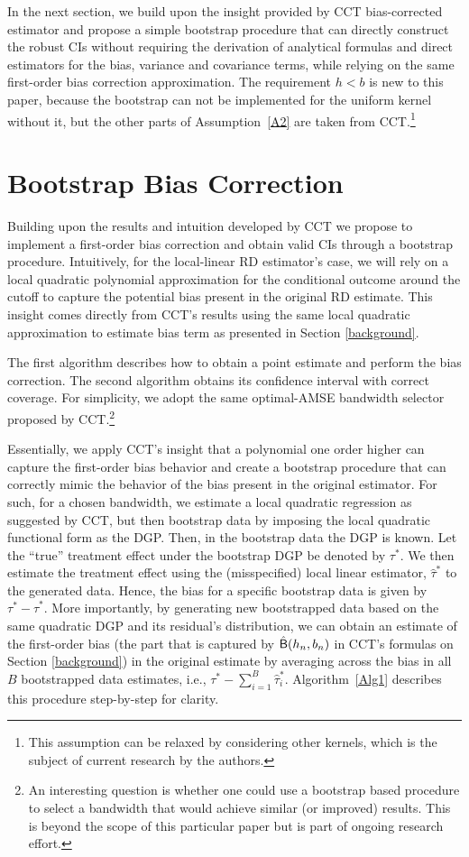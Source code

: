 \documentclass[12pt,fleqn]{article}
\begin{document}
In the next section, we build upon the insight provided by CCT bias-corrected
estimator and propose a simple bootstrap procedure that can directly construct
the robust CIs without requiring the derivation of analytical formulas and
direct estimators for the bias, variance and covariance terms, while relying on
the same first-order bias correction approximation. The requirement $h < b$ is
new to this paper, because the bootstrap can not be implemented for the uniform
kernel without it, but the other parts of Assumption~\ref{A2} are taken from
CCT.\footnote{%
  This assumption can be relaxed by considering other kernels, which is the
  subject of current research by the authors.} %

\section{Bootstrap Bias Correction}\label{boot}

Building upon the results and intuition developed by CCT we propose to implement a first-order bias correction and obtain valid CIs through a bootstrap procedure.
Intuitively, for the local-linear RD estimator's case, we will rely on a local quadratic polynomial approximation for the conditional outcome around the cutoff to capture the potential bias present in the original RD estimate. This insight comes directly from CCT's results using the same local quadratic approximation to estimate bias term as presented in Section \ref{background}.

The first algorithm describes how to obtain a point estimate and perform the bias correction. The second algorithm obtains its confidence interval with correct coverage. For simplicity, we adopt the same optimal-AMSE bandwidth selector proposed by CCT.\footnote{An interesting question is whether one could use a bootstrap based procedure to select a bandwidth that would achieve similar (or improved) results. This is beyond the scope of this particular paper but is part of ongoing research effort.} 

Essentially, we apply CCT's insight that a polynomial one order higher can capture the first-order bias behavior and create a bootstrap procedure that can correctly mimic the behavior of the bias present in the original estimator. For such, for a chosen bandwidth, we estimate a local quadratic regression as suggested by CCT, but then bootstrap data by imposing the local quadratic functional form as the DGP. Then, in the bootstrap data the DGP is known. Let the ``true'' treatment effect under the bootstrap DGP be denoted by $\tau^{*}$. We then estimate the treatment effect using the (misspecified) local linear estimator, $\hat{\tau}^{*}$ to the generated data. Hence, the bias for a specific bootstrap data is given by $\tau^{*}-\hat{\tau}^{*}$. More importantly, by generating new bootstrapped data based on the same quadratic DGP and its residual's distribution, we can obtain an estimate of the first-order bias (the part that is captured by $\hat{\mathsf{B}}(h_{n},b_{n})$ in CCT's formulas on Section \ref{background}) in the original estimate by averaging across the bias in all $B$ bootstrapped data estimates, i.e., $\tau^{*} - \sum_{i = 1}^{B} \hat{\tau}_{ i}^{*}$. Algorithm~\ref{Alg1} describes this procedure step-by-step for clarity.
\end{document}
